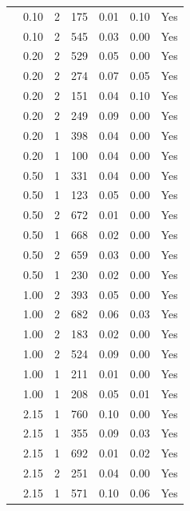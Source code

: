 \begin{longtable}{ | M{2.0cm} | M{2.0cm} | M{1.5cm} | M{1.5cm} | M{2.0cm} | M{2.0cm} | M{1.5cm} | }
                 & 0.10 & 2 & 175 & 0.01 & 0.10 & Yes \\
                 & 0.10 & 2 & 545 & 0.03 & 0.00 & Yes \\
                 & 0.20 & 2 & 529 & 0.05 & 0.00 & Yes \\
                 & 0.20 & 2 & 274 & 0.07 & 0.05 & Yes \\
                 & 0.20 & 2 & 151 & 0.04 & 0.10 & Yes \\
                 & 0.20 & 2 & 249 & 0.09 & 0.00 & Yes \\
                 & 0.20 & 1 & 398 & 0.04 & 0.00 & Yes \\
                 & 0.20 & 1 & 100 & 0.04 & 0.00 & Yes \\
                 & 0.50 & 1 & 331 & 0.04 & 0.00 & Yes \\
                 & 0.50 & 1 & 123 & 0.05 & 0.00 & Yes \\
                 & 0.50 & 2 & 672 & 0.01 & 0.00 & Yes \\
                 & 0.50 & 1 & 668 & 0.02 & 0.00 & Yes \\
                 & 0.50 & 2 & 659 & 0.03 & 0.00 & Yes \\
                 & 0.50 & 1 & 230 & 0.02 & 0.00 & Yes \\
                 & 1.00 & 2 & 393 & 0.05 & 0.00 & Yes \\
                 & 1.00 & 2 & 682 & 0.06 & 0.03 & Yes \\
                 & 1.00 & 2 & 183 & 0.02 & 0.00 & Yes \\
                 & 1.00 & 2 & 524 & 0.09 & 0.00 & Yes \\
                 & 1.00 & 1 & 211 & 0.01 & 0.00 & Yes \\
                 & 1.00 & 1 & 208 & 0.05 & 0.01 & Yes \\
                 & 2.15 & 1 & 760 & 0.10 & 0.00 & Yes \\
                 & 2.15 & 1 & 355 & 0.09 & 0.03 & Yes \\
                 & 2.15 & 1 & 692 & 0.01 & 0.02 & Yes \\
                 & 2.15 & 2 & 251 & 0.04 & 0.00 & Yes \\
                 & 2.15 & 1 & 571 & 0.10 & 0.06 & Yes \\

\end{longtable}
